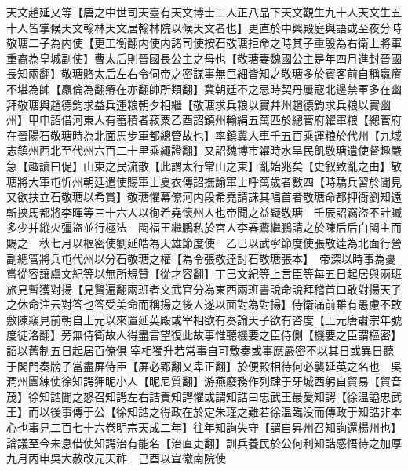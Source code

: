 天文趙延乂等【唐之中世司天臺有天文博士二人正八品下天文觀生九十人天文生五十人皆掌候天文翰林天文居翰林院以候天文者也】更直於中興殿庭與語或至夜分時敬瑭二子為内使【更工衡翻内使内諸司使按石敬瑭拒命之時其子重殷為右衛上將軍重裔為皇城副使】曹太后則晉國長公主之母也【敬瑭妻魏國公主是年四月進封晉國長知兩翻】敬瑭賂太后左右令伺帝之密謀事無巨細皆知之敬瑭多於賓客前自稱羸瘠不堪為帥【羸倫為翻瘠在亦翻帥所類翻】冀朝廷不之忌時契丹屢寇北邊禁軍多在幽拜敬瑭與趙德鈞求益兵運粮朝夕相繼【敬瑭求兵粮以實幷州趙德鈞求兵粮以實幽州】甲申詔借河東人有蓄積者菽粟乙酉詔鎮州輸絹五萬匹於總管府糴軍粮【總管府在晉陽石敬瑭時為北面馬步軍都總管故也】率鎮冀人車千五百乘運粮於代州【九域志鎮州西北至代州六百二十里乘繩證翻】又詔魏博市糴時水旱民飢敬瑭遣使督趣嚴急【趣讀曰促】山東之民流散【此謂太行常山之東】亂始兆矣【史叙致亂之由】敬瑭將大軍屯忻州朝廷遣使賜軍士夏衣傳詔撫諭軍士呼萬歲者數四【時驕兵習於聞見又欲扶立石敬瑭以希賞】敬瑭懼幕僚河内段希堯請誅其唱首者敬瑭命都押衙劉知遠斬挾馬都將李暉等三十六人以徇希堯懷州人也帝聞之益疑敬瑭　壬辰詔竊盜不計贓多少并縱火彊盜並行極法　閩福王繼鵬私於宮人李春鷰繼鵬請之於陳后后白閩主而賜之　秋七月以樞密使劉延皓為天雄節度使　乙巳以武寧節度使張敬逹為北面行營副總管將兵屯代州以分石敬瑭之權【為令張敬逹討石敬瑭張本】　帝深以時事為憂嘗從容讓盧文紀等以無所規贊【從才容翻】丁巳文紀等上言臣等每五日起居與兩班旅見暫獲對揚【見賢遍翻兩班者文武官分為東西兩班書說命說拜稽首曰敢對揚天子之休命注云對答也答受美命而稱揚之後人遂以面對為對揚】侍衛滿前雖有愚慮不敢敷陳竊見前朝自上元以來置延英殿或宰相欲有奏論天子欲有咨度【上元唐肅宗年號度徒洛翻】旁無侍衛故人得盡言望復此故事惟聽機要之臣侍側【機要之臣謂樞密】詔以舊制五日起居百僚俱宰相獨升若常事自可敷奏或事應嚴密不以其日或異日聽于閣門奏牓子當盡屏侍臣【屏必郢翻又卑正翻】於便殿相待何必襲延英之名也　吳潤州團練使徐知諤狎眤小人【眤尼質翻】游燕廢務作列肆于牙城西躬自貿易【貿音茂】徐知誥聞之怒召知諤左右詰責知諤懼或謂知誥曰忠武王最愛知諤【徐温謚忠武王】而以後事傳于公【徐知誥之得政在於定朱瑾之難若徐温臨没而傳政于知誥非本心也事見二百七十六卷明宗天成二年】往年知詢失守【謂自昇州召知詢還楊州也】論議至今未息借使知諤治有能名【治直吏翻】訓兵養民於公何利知誥感悟待之加厚九月丙申吳大赦改元天祚　己酉以宣徽南院使

